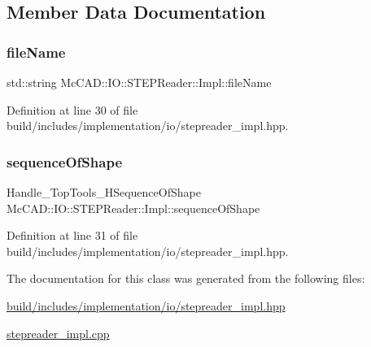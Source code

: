 \subsection{Member Data Documentation}
\mbox{\label{classMcCAD_1_1IO_1_1STEPReader_1_1Impl_ad06c3157407f90e8a4b4524da0c9ceba}} 
\subsubsection{\texorpdfstring{file\+Name}{fileName}}
{\footnotesize\ttfamily std\+::string Mc\+C\+A\+D\+::\+I\+O\+::\+S\+T\+E\+P\+Reader\+::\+Impl\+::file\+Name}



Definition at line 30 of file build/includes/implementation/io/stepreader\+\_\+impl.\+hpp.

\mbox{\label{classMcCAD_1_1IO_1_1STEPReader_1_1Impl_a420bbc46a0f7740eca71ef5aa6ce5e55}} 
\subsubsection{\texorpdfstring{sequence\+Of\+Shape}{sequenceOfShape}}
{\footnotesize\ttfamily Handle\+\_\+\+Top\+Tools\+\_\+\+H\+Sequence\+Of\+Shape Mc\+C\+A\+D\+::\+I\+O\+::\+S\+T\+E\+P\+Reader\+::\+Impl\+::sequence\+Of\+Shape}



Definition at line 31 of file build/includes/implementation/io/stepreader\+\_\+impl.\+hpp.



The documentation for this class was generated from the following files\+:\begin{DoxyCompactItemize}
\item 
\hyperlink{build_2includes_2implementation_2io_2stepreader__impl_8hpp}{build/includes/implementation/io/stepreader\+\_\+impl.\+hpp}\item 
\hyperlink{stepreader__impl_8cpp}{stepreader\+\_\+impl.\+cpp}\end{DoxyCompactItemize}
